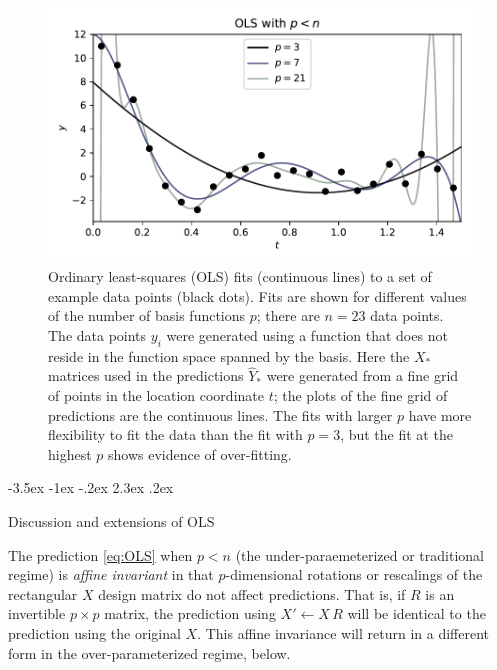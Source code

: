 \documentclass[12pt,letterpaper]{article}
\makeatletter
\newlength{\figurewidth}
\renewcommand\section{\@startsection {section}{1}{\z@}%
  {-3.5ex \@plus -1ex \@minus -.2ex}%
  {2.3ex \@plus.2ex}%
  {\raggedright\normalfont\Large\bfseries}}
\makeatother
\begin{document}
\begin{figure}[t]
    \begin{mdframed}
    \includegraphics[width=\figurewidth]{paper/OLS-under.pdf}
    \caption{Ordinary least-squares (OLS) fits (continuous lines) to a set of example data points (black dots). Fits are shown for different values of the number of basis functions $p$; there are $n=23$ data points. The data points $y_i$ were generated using a function that does not reside in the function space spanned by the basis. Here the $X_\ast$ matrices used in the predictions $\hat{Y}_\ast$ were generated from a fine grid of points in the location coordinate $t$; the plots of the fine grid of predictions are the continuous lines. The fits with larger $p$ have more flexibility to fit the data than the fit with $p=3$, but the fit at the highest $p$ shows evidence of over-fitting.}
    \label{fig:ols1}
    \end{mdframed}
\end{figure}

\section{Discussion and extensions of OLS}

The prediction \eqref{eq:OLS} when $p<n$ (the under-paraemeterized or traditional regime) is \emph{affine invariant} in that $p$-dimensional rotations or rescalings of the rectangular $X$ design matrix do not affect predictions.
That is, if $R$ is an invertible $p\times p$ matrix, the prediction using $X'\leftarrow X\,R$ will be identical to the prediction using the original $X$.
This affine invariance will return in a different form in the over-parameterized regime, below.
\end{document}
